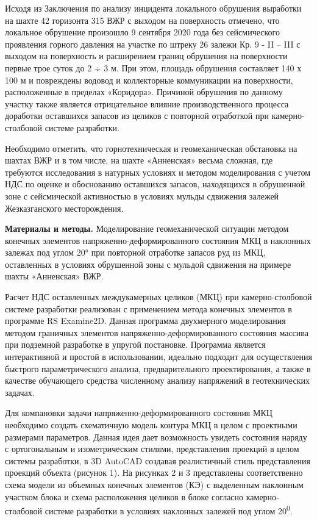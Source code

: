 \begin{multicols}{2}
Исходя из Заключения по анализу инцидента локального обрушения выработки
на шахте 42 горизонта 315 ВЖР с выходом на поверхность отмечено, что
локальное обрушение произошло 9 сентября 2020 года без сейсмического
проявления горного давления на участке по штреку 26 залежи Кр. 9 - II --
III с выходом на поверхность и расширением границ обрушения на
поверхности первые трое суток до 2 ÷ 3 м. При этом, площадь обрушения
составляет 140 х 100 м и повреждены водовод и коллекторные коммуникации
на поверхности, расположенные в пределах «Коридора». Причиной обрушения
по данному участку также является отрицательное влияние
производственного процесса доработки оставшихся запасов из целиков с
повторной отработкой при камерно-столбовой системе разработки.

Необходимо отметить, что горнотехническая и геомеханическая обстановка
на шахтах ВЖР и в том числе, на шахте «Анненская» весьма сложная, где
требуются исследования в натурных условиях и методом моделирования с
учетом НДС по оценке и обоснованию оставшихся запасов, находящихся в
обрушенной зоне с сейсмической активностью в условиях мульды сдвижения
залежей Жезказганского месторождения.

{\bfseries Материалы и методы.} Моделирование геомеханической ситуации
методом конечных элементов напряженно-деформированного состояния МКЦ в
наклонных залежах под углом 20° при повторной отработке запасов руд из
МКЦ, оставленных в условиях обрушенной зоны с мульдой сдвижения на
примере шахты «Анненская» ВЖР.

Расчет НДС оставленных междукамерных целиков (МКЦ) при камерно-столбовой
системе разработки реализован с применением метода конечных элементов в
программе RS Examine2D. Данная программа двухмерного моделирования
методом граничных элементов напряженно-деформированного состояния
массива при подземной разработке в упругой постановке. Программа
является интерактивной и простой в использовании, идеально подходит для
осуществления быстрого параметрического анализа, предварительного
проектирования, а также в качестве обучающего средства численному
анализу напряжений в геотехнических задачах.

Для компановки задачи напряженно-деформированного состояния МКЦ
необходимо создать схематичную модель контура МКЦ в целом с проектными
размерами параметров. Данная идея дает возможность увидеть состояния
наряду с ортогональным и изометрическим стилями, представления проекций
в целом системы разработки, в 3D AutoCAD создавая реалистичный стиль
представления проекций объекта (рисунок 1). На рисунках 2 и 3
представлены соответственно схема модели из объемных конечных элементов
(КЭ) с выделенным наклонным участком блока и схема расположения целиков
в блоке согласно камерно-столбовой системе разработки в условиях
наклонных залежей под углом 20\textsuperscript{0}.
\end{multicols}

